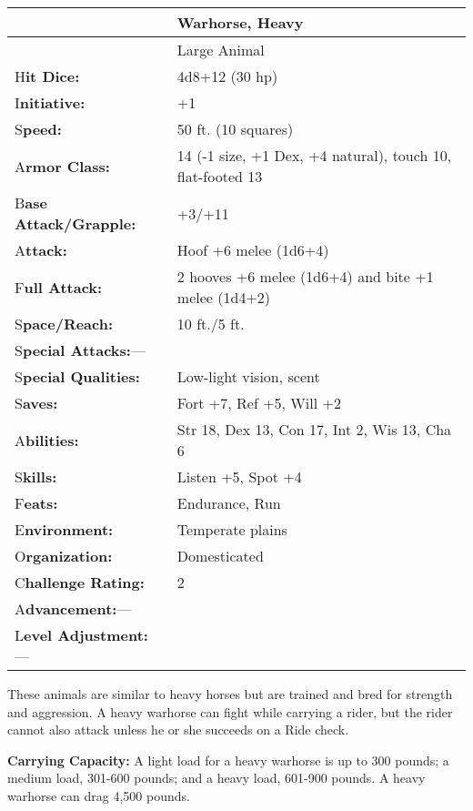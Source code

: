 \documentclass{article}
\begin{document}
\vspace{12pt}
\begin{tabular}{|>{\raggedright}p{91pt}|>{\raggedright}p{226pt}|}
\hline
 & Warhorse, Heavy\tabularnewline
\hline
 & Large Animal\tabularnewline
\hline
H\textbf{it Dice:} & 4d8+12 (30 hp)\tabularnewline
\hline
I\textbf{nitiative:} & +1\tabularnewline
\hline
S\textbf{peed:} & 50 ft. (10 squares)\tabularnewline
\hline
A\textbf{rmor Class:} & 14 (-1 size, +1 Dex, +4 natural), touch 10, flat-footed 
13\tabularnewline
\hline
B\textbf{ase Attack/Grapple:} & +3/+11\tabularnewline
\hline
A\textbf{ttack:} & Hoof +6 melee (1d6+4)\tabularnewline
\hline
F\textbf{ull Attack:} & 2 hooves +6 melee (1d6+4) and bite +1 melee (1d4+2)\tabularnewline
\hline
S\textbf{pace/Reach:} & 10 ft./5 ft.\tabularnewline
\hline
S\textbf{pecial Attacks:}--- & \tabularnewline
\hline
S\textbf{pecial Qualities:} & Low-light vision, scent\tabularnewline
\hline
S\textbf{aves:} & Fort +7, Ref +5, Will +2\tabularnewline
\hline
A\textbf{bilities:} & Str 18, Dex 13, Con 17, Int 2, Wis 13, Cha 6\tabularnewline
\hline
S\textbf{kills:} & Listen +5, Spot +4\tabularnewline
\hline
F\textbf{eats:} & Endurance, Run\tabularnewline
\hline
E\textbf{nvironment:} & Temperate plains\tabularnewline
\hline
O\textbf{rganization:} & Domesticated\tabularnewline
\hline
C\textbf{hallenge Rating:} & 2\tabularnewline
\hline
A\textbf{dvancement:}--- & \tabularnewline
\hline
L\textbf{evel Adjustment:}--- & \tabularnewline
\hline
\end{tabular}

These animals are similar to heavy horses but are trained and bred for strength 
and aggression. A heavy warhorse can fight while carrying a rider, but the rider 
cannot also attack unless he or she succeeds on a Ride check.

\textbf{Carrying Capacity: }A light load for a heavy warhorse is up to 300 pounds; 
a medium load, 301-600 pounds; and a heavy load, 601-900 pounds. A heavy warhorse 
can drag 4,500 pounds.
\end{document}
